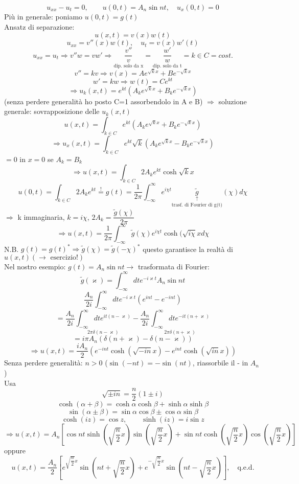 \documentclass[a4paper,11pt]{report}
\begin{document}
$$
u_{xx}-u_t =0, \qquad u(0,t)=A_n\sin nt ,\quad u_x(0,t)=0
$$
Più in generale: poniamo $u(0,t)=g(t)$\\
Ansatz di separazione:
$$
u(x,t)=v(x)w(t)
$$
$$
u_{xx}=v''(x)w(t), \quad u_t=v(x)w'(t)
$$
$$
u_{xx}=u_t \Rightarrow v'' w=vw' \Rightarrow \underset{\text{dip. solo da x}}{\dfrac{v''}{v}} = \underset{\text{dip. solo da t}}{\dfrac{w'}{w}} = k \in C= cost.
$$
$$
v''=kv \Rightarrow v(x)=Ae^{\sqrt{k}x} + B e^{-\sqrt{k} x}
$$
$$
w'=kw \Rightarrow w(t)=Ce^{kt}
$$
$$
\Rightarrow u_k(x,t)=e^{kt}\left(A_k e^{\sqrt{k} x}  + B_k e^{-\sqrt{k}x}\right)
$$
(senza perdere generalità ho posto C=1 assorbendolo in A e B)
$ \Rightarrow$ soluzione generale: sovrapposizione delle $u_k(x,t)$
$$%
u(x,t)=\int_{k\in C} e^{kt}\left(A_k e^{\sqrt{k} x}  + B_k e^{-\sqrt{k}x}\right) 
$$
$$
\Rightarrow u_x(x,t)=\int_{k\in C} e^{kt}\sqrt{k}\left(A_k e^{\sqrt{k} x}  - B_k e^{-\sqrt{k}x}\right) 
$$
$=0$ in $x=0$ se $A_k = B_k$
$$
\Rightarrow u(x,t)=\int_{k\in C} 2A_ke^{kt}\cosh \sqrt{k}x
$$
$$
u(0,t)=\int_{k\in C} 2A_ke^{kt}\overset{!}{=}g(t)=\dfrac{1}{2\pi}\int_{-\infty}^{\infty}e^{i\chi t}\underset{\text{trasf. di Fourier di g(t)}}{\underset{\uparrow}{\tilde{g}}}(\chi)d\chi
$$
$\Rightarrow$ k immaginaria, $k=i\chi$, $2A_k = \dfrac{\tilde{g}(\chi)}{2\pi}$
$$
\Rightarrow u(x,t) =\dfrac{1}{2\pi}\int_{-\infty}^{\infty}\tilde{g}(\chi)e^{i\chi t}\cosh(\sqrt{i\chi}x d\chi
$$
N.B. $g(t)=g(t)^* \Rightarrow \tilde{g}(\chi)=\tilde{g}(-\chi)^*$ questo garantisce la realtà di $u(x,t) (\rightarrow \text{ esercizio!})$\\
Nel nostro esempio: $g(t)=A_n\sin nt\rightarrow$ trasformata di Fourier:
$$
\tilde{g}(\varkappa)=\int_{-\infty}^{\infty}dt e^{-i\varkappa t}A_n \sin nt
$$
$$
\dfrac{A_n}{2i}\int_{-\infty}^{\infty}dt e^{-i\varkappa t}\left(e^{int}-e^{-int}\right)
$$
$$
=\dfrac{A_n}{2i}\underset{2\pi \delta(n-\varkappa)}{\int_{-\infty}^\infty dt e^{it(n-\varkappa)}}-\dfrac{A_n}{2i}\underset{2\pi \delta(n+\varkappa)}{\int_{-\infty}^\infty dt e^{-it(n+\varkappa)}}
$$
$$
=i\pi A_n\left(\delta(n+\varkappa)-\delta(n-\varkappa)\right)
$$
$$
\Rightarrow u(x,t)=\dfrac{iA_n}{2}\left(e^{-int}\cosh(\sqrt{-in}x) - e^{int}\cosh(\sqrt{in}x)\right)
$$
Senza perdere generalità: $n>0$ ($\sin(-nt)=-\sin(nt)$, riassorbile il - in $A_n$)\\
Usa 
$$
\sqrt{\pm in} =\dfrac{n}{2}(1\pm i)
$$
$$
\cosh(\alpha + \beta)=\cosh \alpha \cosh \beta + \sinh \alpha \sinh \beta
$$
$$
\sin(\alpha \pm \beta)=\sin \alpha \cos \beta \pm \cos \alpha \sin \beta 
$$
$$
\cosh(iz)=\cos z, \qquad \sinh(iz)=i\sin z
$$
$$
\Rightarrow u(x,t)=A_n\left[\cos nt \sinh \left(\sqrt{\dfrac{n}{2}}x \right)\sin \left(\sqrt{\dfrac{n}{2}}x \right) + \sin nt \cosh \left(\sqrt{\dfrac{n}{2}}x \right) \cos \left(\sqrt{\dfrac{n}{2}}x \right)\right]
$$
oppure
$$
u(x,t)=\dfrac{A_n}{2}\left[e^{\sqrt{\dfrac{n}{2}}x}\sin\left(nt+\sqrt{\dfrac{n}{2}}x\right) + e^{-\sqrt{\dfrac{n}{2}}x}\sin\left(nt-\sqrt{\dfrac{n}{2}}x  \right) \right], \quad \text{q.e.d.}
$$
\end{document}
